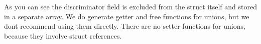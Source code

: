 As you can see the discriminator field is excluded from the struct itself and stored in a separate array. We do generate getter and free functions for unions, but we don\textquotesingle{}t recommend using them directly. There are no setter functions for unions, because they involve struct references. 